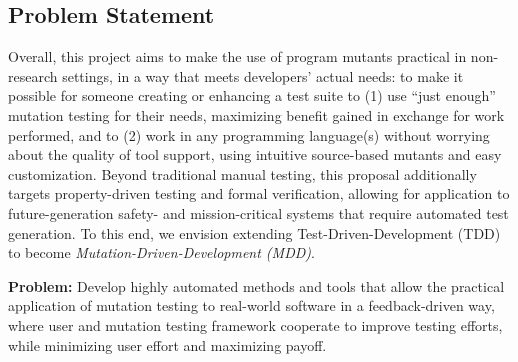 
\subsection{Problem Statement}

Overall, this project aims to make the use of program mutants practical in
non-research settings, in a way that meets developers' actual needs: to make it
possible for someone creating or enhancing a test suite to (1) use ``just
enough'' mutation testing for their needs, maximizing benefit gained in exchange
for work performed, and to (2) work in any programming language(s) without worrying
about the quality of tool support, using intuitive source-based
mutants and easy customization. 
Beyond traditional manual testing, this proposal additionally targets
property-driven testing and formal verification, allowing for application to
future-generation safety- and mission-critical systems that require 
automated test generation.  To this end, we envision extending Test-Driven-Development (TDD) to become
\emph{Mutation-Driven-Development (MDD)}.


\begin{framed} {\bf Problem:} Develop highly automated methods and tools that
  allow the practical application of mutation testing to real-world software in
  a feedback-driven way, where user and mutation testing framework cooperate to
  improve testing efforts, while minimizing user effort and maximizing payoff.
\end{framed}

